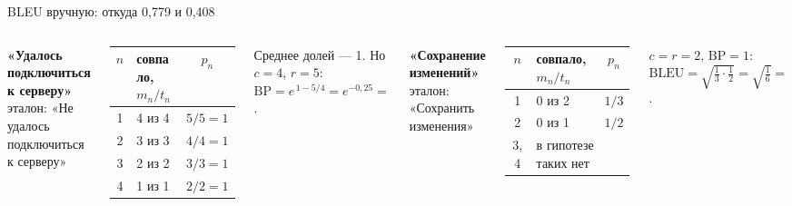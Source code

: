 \documentclass[aspectratio=169,12pt]{beamer}
\newcommand{\пр}{\kern0.04em\vrule height0.45ex depth0pt width0.06em%
  \vrule height0.06em depth0pt width0.42em\vrule height0.45ex depth0pt width0.06em\kern0.04em}
\newcommand{\формула}[1]{\par\vspace{0.25em}{\centering$\displaystyle #1$\par}\vspace{0.25em}}
\newcommand{\блок}[3]{%
  \vspace{1.4cm}
  {\color{brick}\small\bfseries БЛОК #1\par}
  \vspace{0.6cm}
  {\color{navy}\fontsize{28}{32}\selectfont\bfseries #2\par}
  \vspace{0.6cm}
  {\color{ink}\large #3\par}}
\begin{document}
\begin{frame}{BLEU вручную: откуда 0,779 и 0,408}
\color{ink}
  \begin{columns}[T,onlytextwidth]
      {\small\textbf{«Удалось подключиться к серверу»}\\
      {\color{ash}эталон: «Не удалось подключиться к серверу»}\par
      \vspace{0.4em}
      \begin{tabular}{@{}clc@{}}
        \toprule
        $n$ & совпало, $m_n / t_n$ & $p_n$ \\
        \midrule
        1 & 4 из 4 & $5/5 = 1$ \\
        2 & 3 из 3 & $4/4 = 1$ \\
        3 & 2 из 2 & $3/3 = 1$ \\
        4 & 1 из 1 & $2/2 = 1$ \\
        \bottomrule
      \end{tabular}\par
      \vspace{0.4em}
      Среднее долей — 1. Но $c = 4$, $r = 5$:\\
      $\mathrm{BP} = e^{\,1 - 5/4} = e^{-0{,}25} = $ .}
      {\small\textbf{«Сохранение изменений»}\\
      {\color{ash}эталон: «Сохранить изменения»}\par
      \vspace{0.4em}
      \begin{tabular}{@{}clc@{}}
        \toprule
        $n$ & совпало, $m_n / t_n$ & $p_n$ \\
        \midrule
        1 & 0 из 2 & $1/3$ \\
        2 & 0 из 1 & $1/2$ \\
        3, 4 & \multicolumn{2}{l}{в гипотезе таких нет} \\
        \bottomrule
      \end{tabular}\par
      \vspace{0.4em}
      $c = r = 2$, $\mathrm{BP} = 1$:\\
      $\mathrm{BLEU} = \sqrt{\tfrac13\cdot\tfrac12} = \sqrt{\tfrac16} = $ .}
  \end{columns}

\end{frame}
\end{document}
